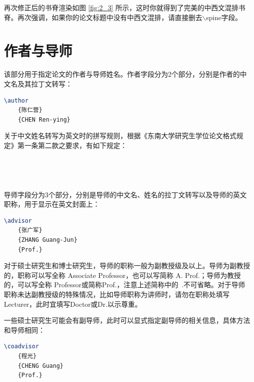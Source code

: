 再次修正后的书脊渲染如图 \ref{fig:2_3} 所示，这时你就得到了完美的中西文混排书脊。再次强调，如果你的论文标题中没有中西文混排，请直接删去{\codefont $\backslash$spine}字段。

\section{作者与导师}

该部分用于指定论文的作者与导师姓名。作者字段分为2个部分，分别是作者的中文名及其拉丁文转写：

\begin{tcolorbox}
\begin{lstlisting}[language=TeX]
\author
    {陈仁营}
    {CHEN Ren-ying}
\end{lstlisting}
\end{tcolorbox}

\noindent 关于中文姓名转写为英文时的拼写规则，根据《东南大学研究生学位论文格式规定》\cite{seugs2015rule}第一条第二款之要求，有如下规定：

~


~

导师字段分为3个部分，分别是导师的中文名、姓名的拉丁文转写以及导师的英文职称，用于显示在英文封面上：

\begin{tcolorbox}
\begin{lstlisting}[language=TeX]
\advisor
    {张广军}
    {ZHANG Guang-Jun}
    {Prof.}
\end{lstlisting}
\end{tcolorbox}

\noindent 对于硕士研究生和博士研究生，导师的职称一般为副教授级及以上。导师为副教授的，职称可以写全称 Associate Professor，也可以写简称 A. Prof.；导师为教授的，可以写全称 Professor或简称Prof.，注意上述简称中的~.不可省略。对于导师职称未达副教授级的特殊情况，比如导师职称为讲师时，请勿在职称处填写Lecturer，此时宜填写Doctor或Dr.以示尊重。

一些硕士研究生可能会有副导师，此时可以显式指定副导师的相关信息，具体方法和导师相同：

\begin{tcolorbox}
\begin{lstlisting}[language=TeX]
\coadvisor
    {程光}
    {CHENG Guang}
    {Prof.}
\end{lstlisting}
\end{tcolorbox}

